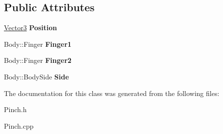 \subsection*{Public Attributes}
\begin{DoxyCompactItemize}
\item 
\hypertarget{class_efficio_1_1_input_recognition_1_1_human_1_1_hands_1_1_pinch_aef25b5e89e91b9e9a7886a087c1b019f}{}\label{class_efficio_1_1_input_recognition_1_1_human_1_1_hands_1_1_pinch_aef25b5e89e91b9e9a7886a087c1b019f} 
\hyperlink{class_efficio_1_1_vector3}{Vector3} {\bfseries Position}
\item 
\hypertarget{class_efficio_1_1_input_recognition_1_1_human_1_1_hands_1_1_pinch_ad8c959f5692cdf6e62381296c9d895fc}{}\label{class_efficio_1_1_input_recognition_1_1_human_1_1_hands_1_1_pinch_ad8c959f5692cdf6e62381296c9d895fc} 
Body\+::\+Finger {\bfseries Finger1}
\item 
\hypertarget{class_efficio_1_1_input_recognition_1_1_human_1_1_hands_1_1_pinch_a54b57c5b8ac5818d94a37fe52a5c2633}{}\label{class_efficio_1_1_input_recognition_1_1_human_1_1_hands_1_1_pinch_a54b57c5b8ac5818d94a37fe52a5c2633} 
Body\+::\+Finger {\bfseries Finger2}
\item 
\hypertarget{class_efficio_1_1_input_recognition_1_1_human_1_1_hands_1_1_pinch_afacf4440ba63d00e52e205b0710798d1}{}\label{class_efficio_1_1_input_recognition_1_1_human_1_1_hands_1_1_pinch_afacf4440ba63d00e52e205b0710798d1} 
Body\+::\+Body\+Side {\bfseries Side}
\end{DoxyCompactItemize}


The documentation for this class was generated from the following files\+:\begin{DoxyCompactItemize}
\item 
Pinch.\+h\item 
Pinch.\+cpp\end{DoxyCompactItemize}
